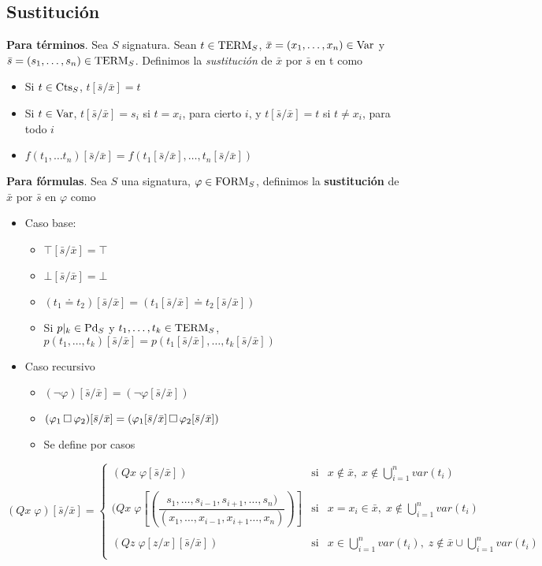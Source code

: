 \subsection{Sustitución}
\begin{definition}[Sustitución]
\textbf{Para términos}. Sea $S$ signatura. Sean $t \in \mbox{TERM}_{S}$, $\bar{x} = (x_1, \dots, x_n) \in \mbox{Var}$ y $\bar{s} = (s_1, \dots, s_n)\in \mbox{TERM}_{S}$. Definimos la \textit{sustitución} de $\bar{x}$ por $\bar{s}$ en t como
\begin{itemize}
    \item Si $t \in \mbox{Cts}_{S}$, $t[\bar{s}/\bar{x}] = t$
    \item Si $t \in \mbox{Var}$, $t[\bar{s}/\bar{x}] = s_i$ si $t = x_i$, para cierto $i$, y $t[\bar{s}/\bar{x}] = t$ si $t \neq x_i$, para todo $i$
    \item $f(t_1, \dots t_n)[\bar{s}/\bar{x}] = f(t_1[\bar{s}/\bar{x}], \dots, t_n[\bar{s}/\bar{x}])$
\end{itemize}


\textbf{Para fórmulas}. Sea $S$ una signatura, $\varphi \in \mbox{FORM}_{S}$, definimos la \textbf{sustitución} de $\bar{x}$ por $\bar{s}$ en $\varphi$ como
\begin{itemize}
    \item Caso base:
    \begin{itemize}
        \item $\top[\bar{s}/\bar{x}]=\top$
        \item $\bot[\bar{s}/\bar{x}]=\bot$
        \item $(t_1\doteq t_2)[\bar{s}/\bar{x}]=(t_1[\bar{s}/\bar{x}]\doteq t_2[\bar{s}/\bar{x}])$
        \item Si $p\vert_k\in \mbox{Pd}_{S}$ y $t_1,\dots,t_k \in \mbox{TERM}_{S}$, $p(t_1,\dots,t_k)[\bar{s}/\bar{x}]=p(t_1[\bar{s}/\bar{x}],\dots,t_k[\bar{s}/\bar{x}])$
    \end{itemize}
    \item Caso recursivo
    \begin{itemize}
        \item $(\neg\varphi)[\bar{s}/\bar{x}]=(\neg\varphi[\bar{s}/\bar{x}])$
        \item $(\varphi_1\, \Box \,\varphi_2)[\bar{s}/\bar{x}]=(\varphi_1[\bar{s}/\bar{x}]\, \Box \,\varphi_2[\bar{s}/\bar{x}])$
        \item Se define por casos
\end{itemize}    
\end{itemize}    
        \[ (Qx\;\varphi)[\bar{s}/\bar{x}]=  \left\lbrace \begin{matrix}
 (Qx\;\varphi[\bar{s}/\bar{x}]) & \mbox{si} & x\notin\bar{x}, \; x \notin\bigcup_{i=1}^nvar(t_i) \\
 \\
 (Qx\;\varphi \left[\left( \dfrac{s_1,\dots,s_{i-1},s_{i+1},\dots,s_n)}{(x_1,\dots,x_{i-1},x_{i+1}\dots,x_n)} \right)\right] & \mbox{si} & x=x_i\in\bar{x}, \; x\notin\bigcup_{i=1}^n var(t_i) \\
\\ 
 (Qz\;\varphi[z/x][\bar{s}/\bar{x}])  & \mbox{si} & x\in\bigcup_{i=1}^nvar(t_i), \;  z \notin \bar{x} \cup \bigcup_{i=1}^n var(t_i) \\
\end{matrix}\right. \]
\end{definition}

